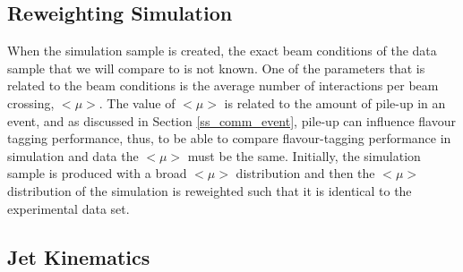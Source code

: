 \documentclass[12pt, onecolumn,notitlepage]{article}
\begin{document}
\subsection{Reweighting Simulation}

When the simulation sample is created, the exact beam conditions of the data sample that we will compare to is not known.
One of the parameters that is related to the beam conditions is the average number of interactions per beam crossing, $< \mu >$.
The value of $< \mu >$ is related to the amount of pile-up in an event, and as discussed in Section \ref{ss_comm_event}, 
pile-up can influence flavour tagging performance,
thus, to be able to compare flavour-tagging performance in simulation and data the $< \mu >$ must be the same.
Initially, the simulation sample is produced with a broad $< \mu >$ distribution and
then the $< \mu >$ distribution of the simulation is reweighted such that it is identical to the experimental data set.



\subsection{Jet Kinematics}


\end{document}
